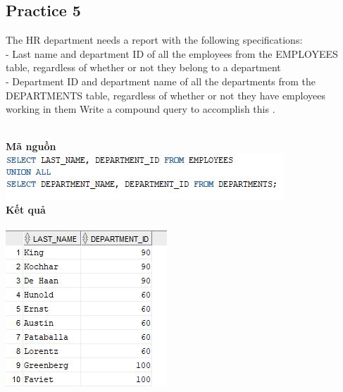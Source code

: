 \documentclass[12pt,a4paper]{report}
\begin{document}
\subsection{Practice 5}
\begin{boxedminipage}[t]{15.5cm}
The HR department needs a report with the following specifications:\\
- Last name and department ID of all the employees from the EMPLOYEES table, 
regardless of whether or not they belong to a department\\
- Department ID and department name of all the departments from the DEPARTMENTS table, 
regardless of whether or not they have employees working in them
Write a compound query to accomplish this .
\end{boxedminipage}
\newline
\\
\textbf{Mã nguồn}
\\
\newline
\includegraphics[scale=1]{56.jpg}\\
\textbf{Kết quả}\\\\
\includegraphics[scale=1]{k56.jpg}
\end{document}
